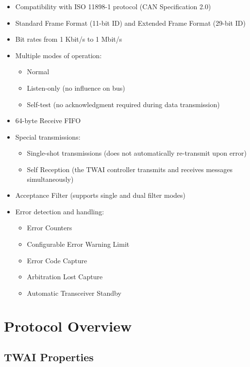 \documentclass[main\_\_EN.tex]{subfiles}
\begin{document}
\begin{itemize}
    \item Compatibility with ISO 11898-1 protocol (CAN Specification 2.0)
    \item Standard Frame Format (11-bit ID) and Extended Frame Format (29-bit ID)
    \item Bit rates from 1 Kbit/s to 1 Mbit/s
    \item Multiple modes of operation:
    \begin{itemize}
        \item Normal
        \item Listen-only (no influence on bus)
        \item Self-test (no acknowledgment required during data transmission)
    \end{itemize}
    \item 64-byte Receive FIFO
    \item Special transmissions:
    \begin{itemize}
        \item Single-shot transmissions (does not automatically re-transmit upon error)
        \item Self Reception (the TWAI controller transmits and receives messages simultaneously)
    \end{itemize}
    \item Acceptance Filter (supports single and dual filter modes)
    \item Error detection and handling:
    \begin{itemize}
        \item Error Counters
        \item Configurable Error Warning Limit
        \item Error Code Capture
        \item Arbitration Lost Capture
    \item Automatic Transceiver Standby
    \end{itemize}
\end{itemize}

\section{Protocol Overview}
\label{sec:twai-functional-protocol}

\subsection{TWAI Properties}
\end{document}
